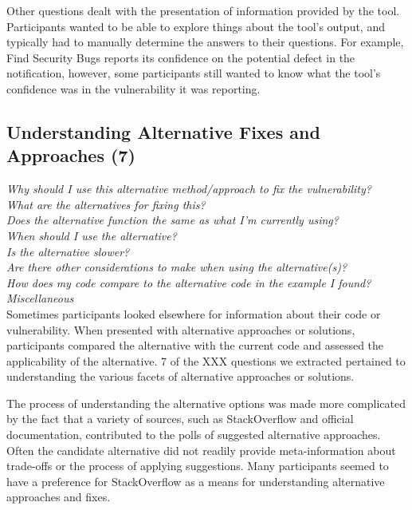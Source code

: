 \documentclass[conference]{IEEEtran}
\begin{document}
Other questions dealt with the presentation of information provided by the tool. Participants wanted to be able to explore things about the tool's output, and typically had to manually determine the answers to their questions. For example, Find Security Bugs reports its confidence on the potential defect in the notification, however, some participants still wanted to know what the tool's confidence was in the vulnerability it was reporting.  




\noindent\subsection{\textbf{Understanding Alternative Fixes and Approaches (7)}}

\noindent\emph{Why should I use this alternative method/approach to fix the vulnerability?} \\
\emph{What are the alternatives for fixing this?} \\
\emph{Does the alternative function the same as what I'm currently using?} \\
\emph{When should I use the alternative?} \\
\emph{Is the alternative slower?} \\
\emph{Are there other considerations to make when using the alternative(s)?} \\
\emph{How does my code compare to the alternative code in the example I found?} \\
\emph{Miscellaneous} \\

Sometimes participants looked elsewhere for information about their code or vulnerability. When presented with alternative approaches or solutions, participants compared the alternative with the current code and assessed the applicability of the alternative. 7 of the XXX questions we extracted pertained to understanding the various facets of alternative approaches or solutions.

The process of understanding the alternative options was made more complicated by the fact that a variety of sources, such as StackOverflow and official documentation, contributed to the polls of suggested alternative approaches. Often the candidate alternative did not readily provide meta-information about trade-offs or the process of applying suggestions. Many participants seemed to have a preference for StackOverflow as a means for understanding alternative approaches and fixes. 
\end{document}
